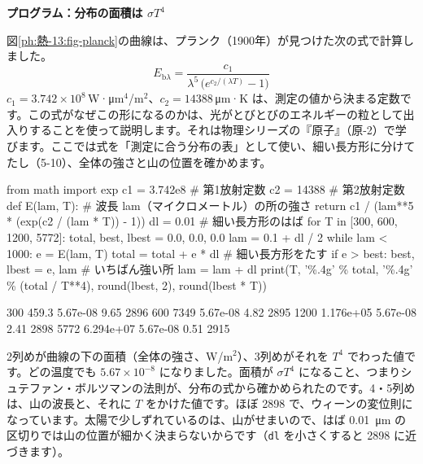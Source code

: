 \noindent\textbf{プログラム：分布の面積は $\sigma T^4$}\par\nobreak
図\ref{ph:熱-13:fig-planck}の曲線は、プランク（1900年）が見つけた次の式で計算しました。
\[ E_{\mathrm b\lambda}=\frac{c_1}{\lambda^5\,\bigl(e^{c_2/(\lambda T)}-1\bigr)} \]
$c_1=3.742\times10^{8}$\,W·\unit{\micro m}$^4$/m$^2$、$c_2=\num{14388}$\,\unit{\micro m}·K は、測定の値から決まる定数です。この式がなぜこの形になるのかは、光がとびとびのエネルギーの粒として出入りすることを使って説明します。それは物理シリーズの『原子』（原-2）で学びます。ここでは式を「測定に合う分布の表」として使い、細い長方形に分けてたし（5-10）、全体の強さと山の位置を確かめます。
\begin{phcode}[Python]
from math import exp
c1 = 3.742e8     \# 第1放射定数
c2 = 14388       \# 第2放射定数
def E(lam, T):   \# 波長 lam（マイクロメートル）の所の強さ
    return c1 / (lam**5 * (exp(c2 / (lam * T)) - 1))
dl = 0.01        \# 細い長方形のはば
for T in [300, 600, 1200, 5772]:
    total, best, lbest = 0.0, 0.0, 0.0
    lam = 0.1 + dl / 2
    while lam < 1000:
        e = E(lam, T)
        total = total + e * dl      \# 細い長方形をたす
        if e > best:
            best, lbest = e, lam    \# いちばん強い所
        lam = lam + dl
    print(T, '\%.4g' \% total, '\%.4g' \% (total / T**4),
          round(lbest, 2), round(lbest * T))
\end{phcode}
\begin{phcodeout}
300 459.3 5.67e-08 9.65 2896
600 7349 5.67e-08 4.82 2895
1200 1.176e+05 5.67e-08 2.41 2898
5772 6.294e+07 5.67e-08 0.51 2915
\end{phcodeout}
2列めが曲線の下の面積（全体の強さ、W/m$^2$）、3列めがそれを $T^4$ でわった値です。どの温度でも $5.67\times10^{-8}$ になりました。面積が $\sigma T^4$ になること、つまりシュテファン・ボルツマンの法則が、分布の式から確かめられたのです。4・5列めは、山の波長と、それに $T$ をかけた値です。ほぼ \num{2898} で、ウィーンの変位則になっています。太陽で少しずれているのは、山がせまいので、はば \qty{0.01}{\micro m} の区切りでは山の位置が細かく決まらないからです（\texttt{dl} を小さくすると \num{2898} に近づきます）。


